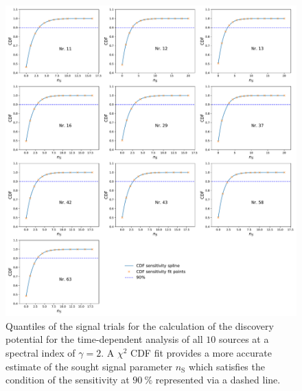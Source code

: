 \begin{figure}
    \centering
    \includegraphics[width=\linewidth]{Plots/appendix/9_years_gfu_gold_time_dep_cdf_sens.pdf}
    \caption{Quantiles of the signal trials for the calculation of the discovery potential for the time-dependent analysis of all $\num{10}$ sources at a spectral index of $\gamma=\num{2}$. A $\chi^2$ CDF fit provides a more accurate estimate of the sought signal parameter $n_\text{S}$ which satisfies the condition of the sensitivity at $\SI{90}{\percent}$ represented via a dashed line.}
    \label{fig:time_dep_cdf_sens}
\end{figure}

